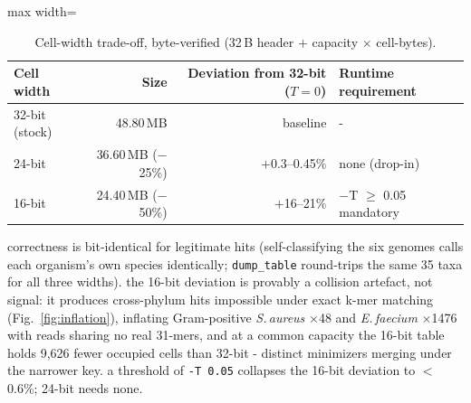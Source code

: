 \documentclass[10.5pt]{article}
\newcommand{\code}[1]{\texttt{\footnotesize #1}}
\begin{document}
\begin{table}[h!]
\centering\footnotesize
\caption{Cell-width trade-off, byte-verified (32\,B header $+$ capacity $\times$ cell-bytes).}
\label{tab:cellwidth}
\begin{adjustbox}{max width=\textwidth}
\begin{tabular}{@{}lrrl@{}}
\toprule
\textbf{Cell width} & \textbf{Size} & \textbf{Deviation from 32-bit ($T{=}0$)} & \textbf{Runtime requirement} \\
\midrule
32-bit (stock) & 48.80\,MB & baseline & - \\
24-bit & 36.60\,MB ($-$25\%) & $+$0.3--0.45\% & none (drop-in) \\
16-bit & 24.40\,MB ($-$50\%) & $+$16--21\% & $-$T $\geq$ 0.05 mandatory \\
\bottomrule
\end{tabular}
\end{adjustbox}
\end{table}

correctness is bit-identical for legitimate hits (self-classifying the six genomes calls each organism's own species identically; \code{dump\_table} round-trips the same 35 taxa for all three widths). the 16-bit deviation is provably a collision artefact, not signal: it produces cross-phylum hits impossible under exact k-mer matching (Fig.~\ref{fig:inflation}), inflating Gram-positive \textit{S.\,aureus} $\times$48 and \textit{E.\,faecium} $\times$1476 with reads sharing no real 31-mers, and at a common capacity the 16-bit table holds 9{,}626 fewer occupied cells than 32-bit - distinct minimizers merging under the narrower key. a threshold of \code{-T 0.05} collapses the 16-bit deviation to $<$0.6\%; 24-bit needs none.
\end{document}

